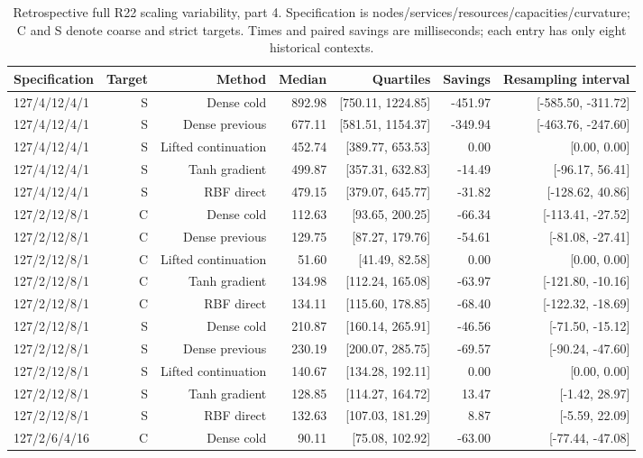 \begin{table}[tbp]\centering\scriptsize
\caption{Retrospective full R22 scaling variability, part 4. Specification is nodes/services/resources/capacities/curvature; C and S denote coarse and strict targets. Times and paired savings are milliseconds; each entry has only eight historical contexts.}
\label{tab:r24-old-scaling-4}
\begin{tabular}{lrrrrrr}
\toprule
Specification & Target & Method & Median & Quartiles & Savings & Resampling interval\\
\midrule
127/4/12/4/1 & S & Dense cold & 892.98 & [750.11, 1224.85] & -451.97 & [-585.50, -311.72]\\
127/4/12/4/1 & S & Dense previous & 677.11 & [581.51, 1154.37] & -349.94 & [-463.76, -247.60]\\
127/4/12/4/1 & S & Lifted continuation & 452.74 & [389.77, 653.53] & 0.00 & [0.00, 0.00]\\
127/4/12/4/1 & S & Tanh gradient & 499.87 & [357.31, 632.83] & -14.49 & [-96.17, 56.41]\\
127/4/12/4/1 & S & RBF direct & 479.15 & [379.07, 645.77] & -31.82 & [-128.62, 40.86]\\
127/2/12/8/1 & C & Dense cold & 112.63 & [93.65, 200.25] & -66.34 & [-113.41, -27.52]\\
127/2/12/8/1 & C & Dense previous & 129.75 & [87.27, 179.76] & -54.61 & [-81.08, -27.41]\\
127/2/12/8/1 & C & Lifted continuation & 51.60 & [41.49, 82.58] & 0.00 & [0.00, 0.00]\\
127/2/12/8/1 & C & Tanh gradient & 134.98 & [112.24, 165.08] & -63.97 & [-121.80, -10.16]\\
127/2/12/8/1 & C & RBF direct & 134.11 & [115.60, 178.85] & -68.40 & [-122.32, -18.69]\\
127/2/12/8/1 & S & Dense cold & 210.87 & [160.14, 265.91] & -46.56 & [-71.50, -15.12]\\
127/2/12/8/1 & S & Dense previous & 230.19 & [200.07, 285.75] & -69.57 & [-90.24, -47.60]\\
127/2/12/8/1 & S & Lifted continuation & 140.67 & [134.28, 192.11] & 0.00 & [0.00, 0.00]\\
127/2/12/8/1 & S & Tanh gradient & 128.85 & [114.27, 164.72] & 13.47 & [-1.42, 28.97]\\
127/2/12/8/1 & S & RBF direct & 132.63 & [107.03, 181.29] & 8.87 & [-5.59, 22.09]\\
127/2/6/4/16 & C & Dense cold & 90.11 & [75.08, 102.92] & -63.00 & [-77.44, -47.08]\\

\end{tabular}
\end{table}
